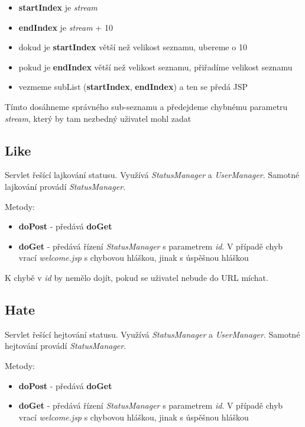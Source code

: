 \documentclass[
12pt,
a4paper,
pdftex,
czech,
titlepage
]{report}
\begin{document}
\begin{itemize}
\begin{itemize}
\begin{itemize}
\item \textbf{startIndex} je \textit{stream}
\item \textbf{endIndex} je \textit{stream} + 10
\item dokud je \textbf{startIndex} větší než velikost seznamu, ubereme o 10
\item pokud je \textbf{endIndex} větší než velikost seznamu, přiřadíme velikost seznamu
\item vezmeme subList (\textbf{startIndex}, \textbf{endIndex}) a ten se předá JSP
\end{itemize}
Tímto dosáhneme správného sub-seznamu a předejdeme chybnému parametru \textit{stream}, který by tam nezbedný uživatel mohl zadat
\end{itemize}
\end{itemize}

\subsection{Like}

Servlet řešící lajkování statusu. Využívá \textit{StatusManager} a \textit{UserManager}. Samotné lajkování provádí \textit{StatusManager}.

Metody:
\begin{itemize}
\item \textbf{doPost} - předává \textbf{doGet}
\item \textbf{doGet} - předává řízení \textit{StatusManager} s parametrem \textit{id}. V případě chyb vrací \textit{welcome.jsp} s chybovou hláškou, jinak s úspěšnou hláškou
\end{itemize}

K chybě v \textit{id} by nemělo dojít, pokud se uživatel nebude do URL míchat.

\subsection{Hate}

Servlet řešící hejtování statusu. Využívá \textit{StatusManager} a \textit{UserManager}. Samotné hejtování provádí \textit{StatusManager}.

Metody:
\begin{itemize}
\item \textbf{doPost} - předává \textbf{doGet}
\item \textbf{doGet} - předává řízení \textit{StatusManager} s parametrem \textit{id}. V případě chyb vrací \textit{welcome.jsp} s chybovou hláškou, jinak s úspěšnou hláškou
\end{itemize}
\end{document}
